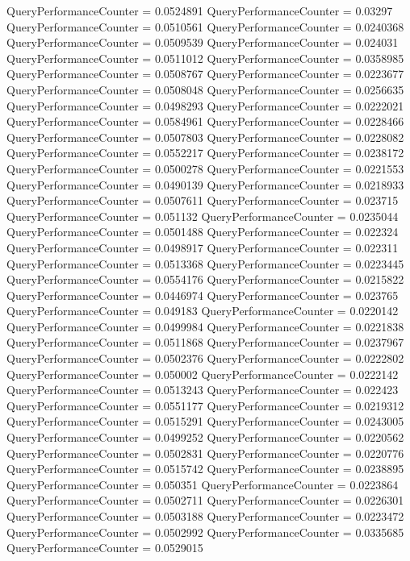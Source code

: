 \documentclass[9pt]{article}
\theoremstyle{plain}
\theoremstyle{definition}
\theoremstyle{remark}
\numberwithin{equation}{section}
\begin{document}
QueryPerformanceCounter  =  0.0524891
QueryPerformanceCounter  =  0.03297
QueryPerformanceCounter  =  0.0510561
QueryPerformanceCounter  =  0.0240368
QueryPerformanceCounter  =  0.0509539
QueryPerformanceCounter  =  0.024031
QueryPerformanceCounter  =  0.0511012
QueryPerformanceCounter  =  0.0358985
QueryPerformanceCounter  =  0.0508767
QueryPerformanceCounter  =  0.0223677
QueryPerformanceCounter  =  0.0508048
QueryPerformanceCounter  =  0.0256635
QueryPerformanceCounter  =  0.0498293
QueryPerformanceCounter  =  0.0222021
QueryPerformanceCounter  =  0.0584961
QueryPerformanceCounter  =  0.0228466
QueryPerformanceCounter  =  0.0507803
QueryPerformanceCounter  =  0.0228082
QueryPerformanceCounter  =  0.0552217
QueryPerformanceCounter  =  0.0238172
QueryPerformanceCounter  =  0.0500278
QueryPerformanceCounter  =  0.0221553
QueryPerformanceCounter  =  0.0490139
QueryPerformanceCounter  =  0.0218933
QueryPerformanceCounter  =  0.0507611
QueryPerformanceCounter  =  0.023715
QueryPerformanceCounter  =  0.051132
QueryPerformanceCounter  =  0.0235044
QueryPerformanceCounter  =  0.0501488
QueryPerformanceCounter  =  0.022324
QueryPerformanceCounter  =  0.0498917
QueryPerformanceCounter  =  0.022311
QueryPerformanceCounter  =  0.0513368
QueryPerformanceCounter  =  0.0223445
QueryPerformanceCounter  =  0.0554176
QueryPerformanceCounter  =  0.0215822
QueryPerformanceCounter  =  0.0446974
QueryPerformanceCounter  =  0.023765
QueryPerformanceCounter  =  0.049183
QueryPerformanceCounter  =  0.0220142
QueryPerformanceCounter  =  0.0499984
QueryPerformanceCounter  =  0.0221838
QueryPerformanceCounter  =  0.0511868
QueryPerformanceCounter  =  0.0237967
QueryPerformanceCounter  =  0.0502376
QueryPerformanceCounter  =  0.0222802
QueryPerformanceCounter  =  0.050002
QueryPerformanceCounter  =  0.0222142
QueryPerformanceCounter  =  0.0513243
QueryPerformanceCounter  =  0.022423
QueryPerformanceCounter  =  0.0551177
QueryPerformanceCounter  =  0.0219312
QueryPerformanceCounter  =  0.0515291
QueryPerformanceCounter  =  0.0243005
QueryPerformanceCounter  =  0.0499252
QueryPerformanceCounter  =  0.0220562
QueryPerformanceCounter  =  0.0502831
QueryPerformanceCounter  =  0.0220776
QueryPerformanceCounter  =  0.0515742
QueryPerformanceCounter  =  0.0238895
QueryPerformanceCounter  =  0.050351
QueryPerformanceCounter  =  0.0223864
QueryPerformanceCounter  =  0.0502711
QueryPerformanceCounter  =  0.0226301
QueryPerformanceCounter  =  0.0503188
QueryPerformanceCounter  =  0.0223472
QueryPerformanceCounter  =  0.0502992
QueryPerformanceCounter  =  0.0335685
QueryPerformanceCounter  =  0.0529015
\end{document}

